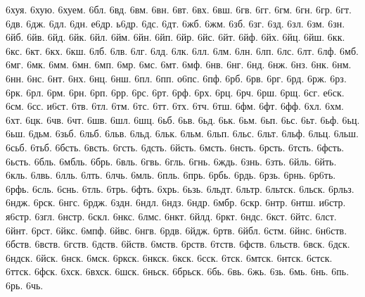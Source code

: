 {6хуя.
6хую.
6хуем.
6бл.
6вд.
6вм.
6вн.
6вт.
6вх.
6вш.
6гв.
6гг.
6гм.
6гн.
6гр.
6гт.
6дв.
6дж.
6дл.
6дн.
е6др.
ь6др.
6дс.
6дт.
6жб.
6жм.
6зб.
6зг.
6зд.
6зл.
6зм.
6зн.
6йб.
6йв.
6йд.
6йк.
6йл.
6йм.
6йн.
6йп.
6йр.
6йс.
6йт.
6йф.
6йх.
6йц.
6йш.
6кк.
6кс.
6кт.
6кх.
6кш.
6лб.
6лв.
6лг.
6лд.
6лк.
6лл.
6лм.
6лн.
6лп.
6лс.
6лт.
6лф.
6мб.
6мг.
6мк.
6мм.
6мн.
6мп.
6мр.
6мс.
6мт.
6мф.
6нв.
6нг.
6нд.
6нж.
6нз.
6нк.
6нм.
6нн.
6нс.
6нт.
6нх.
6нц.
6нш.
6пл.
6пп.
о6пс.
6пф.
6рб.
6рв.
6рг.
6рд.
6рж.
6рз.
6рк.
6рл.
6рм.
6рн.
6рп.
6рр.
6рс.
6рт.
6рф.
6рх.
6рц.
6рч.
6рш.
6рщ.
6сг.
е6ск.
6см.
6сс.
и6ст.
6тв.
6тл.
6тм.
6тс.
6тт.
6тх.
6тч.
6тш.
6фм.
6фт.
6фф.
6хл.
6хм.
6хт.
6цк.
6чв.
6чт.
6шв.
6шл.
6шц.
6ьб.
6ьв.
6ьд.
6ьк.
6ьм.
6ьп.
6ьс.
6ьт.
6ьф.
6ьц.
6ьш.
6дьм.
6зьб.
6льб.
6льв.
6льд.
6льк.
6льм.
6льп.
6льс.
6льт.
6льф.
6льц.
6льш.
6сьб.
6тьб.
6бсть.
6всть.
6гсть.
6дсть.
6йсть.
6мсть.
6нсть.
6рсть.
6тсть.
6фсть.
6ьсть.
6бль.
6мбль.
6брь.
6вль.
6гвь.
6гль.
6гнь.
6ждь.
6знь.
6зть.
6йль.
6йть.
6кль.
6лвь.
6лль.
6лть.
6лчь.
6мль.
6пль.
6прь.
6рбь.
6рдь.
6рзь.
6рнь.
6р6ть.
6рфь.
6сль.
6снь.
6тль.
6трь.
6фть.
6хрь.
6ьзь.
6льдт.
6льтр.
6льтск.
6льск.
6рльз.
6ндж.
6рск.
6нгс.
6рдж.
6здн.
6ндл.
6ндз.
6ндр.
6мбр.
6скр.
6нтр.
6нтш.
и6стр.
я6стр.
6згл.
6нстр.
6скл.
6нкс.
6лмс.
6нкт.
6йлд.
6ркт.
6ндс.
6кст.
6йтс.
6лст.
6йнт.
6рст.
6йкс.
6мпф.
6йвс.
6нгв.
6рдв.
6йдж.
6ртв.
6йбл.
6стм.
6йнс.
6н6ств.
6бств.
6вств.
6гств.
6дств.
6йств.
6мств.
6рств.
6тств.
6фств.
6льств.
6вск.
6дск.
6ндск.
6йск.
6нск.
6мск.
6ркск.
6нкск.
6кск.
6сск.
6тск.
6мтск.
6нтск.
6стск.
6ттск.
6фск.
6хск.
6вхск.
6шск.
6ньск.
6брьск.
6бь.
6вь.
6жь.
6зь.
6мь.
6нь.
6пь.
6рь.
6чь.
}
